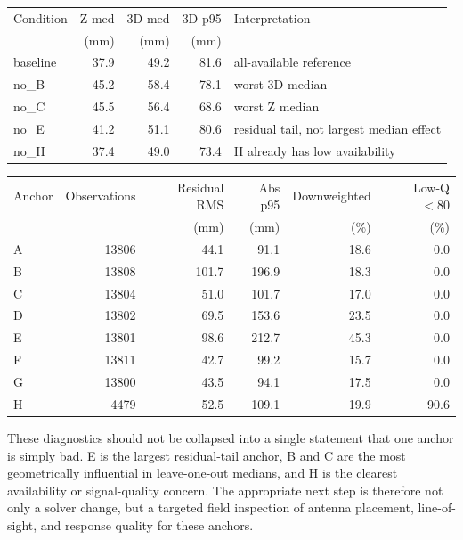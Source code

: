 \documentclass[11pt]{article}
\begin{document}
\begin{center}
\small
\begin{tabular}{l r r r l}
\toprule
Condition & Z med & 3D med & 3D p95 & Interpretation \\
 & (mm) & (mm) & (mm) & \\
\midrule
baseline & 37.9 & 49.2 & 81.6 & all-available reference \\
no\_B & 45.2 & 58.4 & 78.1 & worst 3D median \\
no\_C & 45.5 & 56.4 & 68.6 & worst Z median \\
no\_E & 41.2 & 51.1 & 80.6 & residual tail, not largest median effect \\
no\_H & 37.4 & 49.0 & 73.4 & H already has low availability \\
\bottomrule
\end{tabular}
\end{center}

\begin{center}
\small
\setlength{\tabcolsep}{4pt}
\begin{tabular}{l r r r r r}
\toprule
Anchor & Observations & Residual RMS & Abs p95 & Downweighted & Low-Q $<80$ \\
 & & (mm) & (mm) & (\%) & (\%) \\
\midrule
A & 13806 & 44.1 & 91.1 & 18.6 & 0.0 \\
B & 13808 & 101.7 & 196.9 & 18.3 & 0.0 \\
C & 13804 & 51.0 & 101.7 & 17.0 & 0.0 \\
D & 13802 & 69.5 & 153.6 & 23.5 & 0.0 \\
E & 13801 & 98.6 & 212.7 & 45.3 & 0.0 \\
F & 13811 & 42.7 & 99.2 & 15.7 & 0.0 \\
G & 13800 & 43.5 & 94.1 & 17.5 & 0.0 \\
H & 4479 & 52.5 & 109.1 & 19.9 & 90.6 \\
\bottomrule
\end{tabular}
\end{center}

These diagnostics should not be collapsed into a single statement that one anchor is simply bad. E is the largest residual-tail anchor, B and C are the most geometrically influential in leave-one-out medians, and H is the clearest availability or signal-quality concern. The appropriate next step is therefore not only a solver change, but a targeted field inspection of antenna placement, line-of-sight, and response quality for these anchors.
\end{document}

